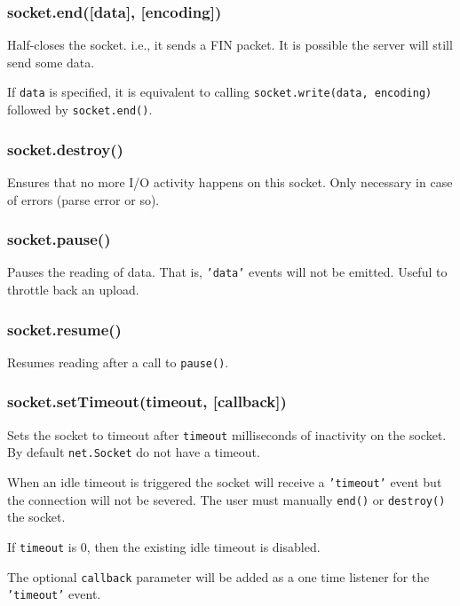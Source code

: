 \subsubsection{socket.end({[}data{]}, {[}encoding{]})}

Half-closes the socket. i.e., it sends a FIN packet. It is possible the
server will still send some data.

If \texttt{data} is specified, it is equivalent to calling
\texttt{socket.write(data, encoding)} followed by \texttt{socket.end()}.

\subsubsection{socket.destroy()}

Ensures that no more I/O activity happens on this socket. Only necessary
in case of errors (parse error or so).

\subsubsection{socket.pause()}

Pauses the reading of data. That is, \texttt{'data'} events will not be
emitted. Useful to throttle back an upload.

\subsubsection{socket.resume()}

Resumes reading after a call to \texttt{pause()}.

\subsubsection{socket.setTimeout(timeout, {[}callback{]})}

Sets the socket to timeout after \texttt{timeout} milliseconds of
inactivity on the socket. By default \texttt{net.Socket} do not have a
timeout.

When an idle timeout is triggered the socket will receive a
\texttt{'timeout'} event but the connection will not be severed. The
user must manually \texttt{end()} or \texttt{destroy()} the socket.

If \texttt{timeout} is 0, then the existing idle timeout is disabled.

The optional \texttt{callback} parameter will be added as a one time
listener for the \texttt{'timeout'} event.

